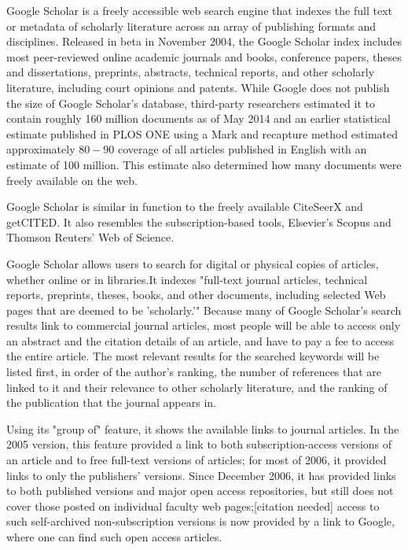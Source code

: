 \begin{enumerate}
	Google Scholar is a freely accessible web search engine that indexes the full text or metadata of scholarly literature across an array of publishing formats and disciplines. Released in beta in November 2004, the Google Scholar index includes most peer-reviewed online academic journals and books, conference papers, theses and dissertations, preprints, abstracts, technical reports, and other scholarly literature, including court opinions and patents. While Google does not publish the size of Google Scholar's database, third-party researchers estimated it to contain roughly 160 million documents as of May 2014 and an earlier statistical estimate published in PLOS ONE using a Mark and recapture method estimated approximately $80-90$ coverage of all articles published in English with an estimate of 100 million. This estimate also determined how many documents were freely available on the web.
	
	Google Scholar is similar in function to the freely available CiteSeerX and getCITED. It also resembles the subscription-based tools, Elsevier's Scopus and Thomson Reuters' Web of Science.
	
	Google Scholar allows users to search for digital or physical copies of articles, whether online or in libraries.It indexes "full-text journal articles, technical reports, preprints, theses, books, and other documents, including selected Web pages that are deemed to be 'scholarly.'" Because many of Google Scholar's search results link to commercial journal articles, most people will be able to access only an abstract and the citation details of an article, and have to pay a fee to access the entire article. The most relevant results for the searched keywords will be listed first, in order of the author's ranking, the number of references that are linked to it and their relevance to other scholarly literature, and the ranking of the publication that the journal appears in.
	
	Using its "group of" feature, it shows the available links to journal articles. In the 2005 version, this feature provided a link to both subscription-access versions of an article and to free full-text versions of articles; for most of 2006, it provided links to only the publishers' versions. Since December 2006, it has provided links to both published versions and major open access repositories, but still does not cover those posted on individual faculty web pages;[citation needed] access to such self-archived non-subscription versions is now provided by a link to Google, where one can find such open access articles.
	

\end{enumerate}
